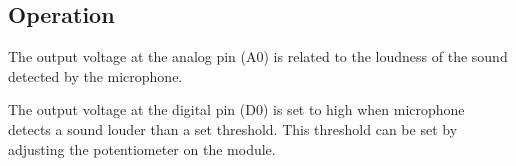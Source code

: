 \subsection*{Operation}
The output voltage at the analog pin (A0) is related to the loudness of the sound detected by the microphone.

The output voltage at the digital pin (D0) is set to high when microphone detects a sound louder than a set threshold. This threshold can be set by adjusting the potentiometer on the module.

%